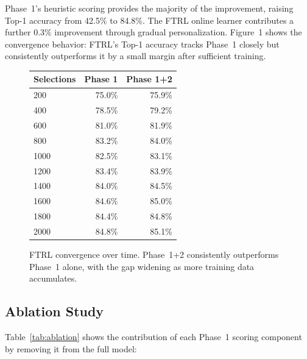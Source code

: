 \documentclass[11pt]{article}
\begin{document}
Phase~1's heuristic scoring provides the majority of the improvement, raising
Top-1 accuracy from 42.5\% to 84.8\%. The FTRL online learner contributes a
further 0.3\% improvement through gradual personalization. Figure~1 shows the
convergence behavior: FTRL's Top-1 accuracy tracks Phase~1 closely but
consistently outperforms it by a small margin after sufficient training.

\begin{figure}[h]
\centering
\begin{tabular}{lrr}
\toprule
\textbf{Selections} & \textbf{Phase 1} & \textbf{Phase 1+2} \\
\midrule
200  & 75.0\% & 75.9\% \\
400  & 78.5\% & 79.2\% \\
600  & 81.0\% & 81.9\% \\
800  & 83.2\% & 84.0\% \\
1000 & 82.5\% & 83.1\% \\
1200 & 83.4\% & 83.9\% \\
1400 & 84.0\% & 84.5\% \\
1600 & 84.6\% & 85.0\% \\
1800 & 84.4\% & 84.8\% \\
2000 & 84.8\% & 85.1\% \\
\bottomrule
\end{tabular}
\caption{FTRL convergence over time. Phase~1+2 consistently outperforms
  Phase~1 alone, with the gap widening as more training data accumulates.}
\label{fig:convergence}
\end{figure}

\subsection{Ablation Study}

Table~\ref{tab:ablation} shows the contribution of each Phase~1 scoring
component by removing it from the full model:
\end{document}
